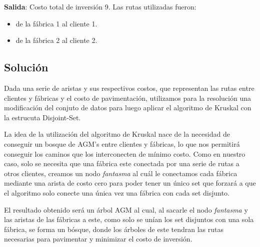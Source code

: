 \documentclass[a4paper, 10pt, twoside]{article}
\begin{document}
\textbf{Salida}: Costo total de inversión 9. Las rutas utilizadas fueron:
\begin{itemize}
\item{de la fábrica 1 al cliente 1.}
\item{de la fábrica 2 al cliente 2.}
\end{itemize}

\subsection{Solución}

Dada una serie de aristas y sus respectivos costos, que representan las rutas entre clientes y fábricas y el costo de pavimentación, utilizamos para la resolución una modificación del conjuto de datos para luego aplicar el algoritmo de Kruskal con la estrucuta Disjoint-Set.

La idea de la utilización del algoritmo de Kruskal nace de la necesidad de conseguir un bosque de AGM's entre clientes y fábricas, lo que nos permitirá conseguir los caminos que los interconecten de mínimo costo. Como en nuestro caso, solo se necesita que una fábrica este conectada por una serie de rutas a otros clientes, creamos un nodo \textit{fantasma} al cuál le conectamos cada fábrica mediante una arista de costo cero para poder tener un único set que forzará a que el algoritmo solo conecte una única vez una fábrica con cada set disjunto.

El resultado obtenido será un árbol AGM al cual, al sacarle el nodo \textit{fantasma} y las aristas de las fábricas a este, como solo se unían los set disjuntos con una sola fábrica, se forma un bósque, donde los árboles de este tendran las rutas necesarias para pavimentar y minimizar el costo de inversión.
\end{document}
